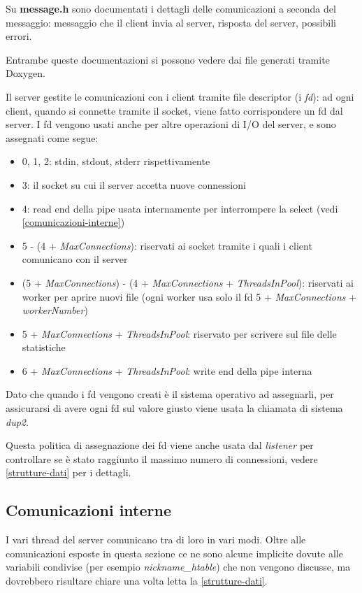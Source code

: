 \documentclass[a4paper]{article}
\theoremstyle{theorem}
\theoremstyle{remark}
\theoremstyle{definition}
\theoremstyle{corollary}
\theoremstyle{lemma}
\newcommand\file[1]{%
	\textbf{#1}}
\newcommand\codeName[1]{%
	\textit{#1}}
\begin{document}
Su \file{message.h} sono documentati i dettagli delle comunicazioni a seconda del messaggio: messaggio che il client invia al server, risposta del server, possibili errori.

Entrambe queste documentazioni si possono vedere dai file generati tramite Doxygen.

Il server gestite le comunicazioni con i client tramite file descriptor (i \textit{fd}): ad ogni client, quando si connette tramite il socket, viene fatto corrispondere un fd dal server. I fd vengono usati anche per altre operazioni di I/O del server, e sono assegnati come segue:
\begin{itemize}
	\item 0, 1, 2: stdin, stdout, stderr rispettivamente
	\item 3: il socket su cui il server accetta nuove connessioni
	\item 4: read end della pipe usata internamente per interrompere la select (vedi \autoref{comunicazioni-interne})
	\item 5 - (4 + \codeName{MaxConnections}): riservati ai socket tramite i quali i client comunicano con il server
	\item (5 + \codeName{MaxConnections}) - (4 + \codeName{MaxConnections} + \codeName{ThreadsInPool}): riservati ai worker per aprire nuovi file (ogni worker usa solo il fd 5 + \codeName{MaxConnections} + \codeName{workerNumber})
	\item 5 + \codeName{MaxConnections} + \codeName{ThreadsInPool}: riservato per scrivere sul file delle statistiche
	\item 6 + \codeName{MaxConnections} + \codeName{ThreadsInPool}: write end della pipe interna
\end{itemize}
Dato che quando i fd vengono creati è il sistema operativo ad assegnarli, per assicurarsi di avere ogni fd sul valore giusto viene usata la chiamata di sistema \codeName{dup2}.

Questa politica di assegnazione dei fd viene anche usata dal \codeName{listener} per controllare se è stato raggiunto il massimo numero di connessioni, vedere \autoref{strutture-dati} per i dettagli.

\subsection{Comunicazioni interne}\label{comunicazioni-interne}
I vari thread del server comunicano tra di loro in vari modi. Oltre alle comunicazioni esposte in questa sezione ce ne sono alcune implicite dovute alle variabili condivise (per esempio \codeName{nickname\_htable}) che non vengono discusse, ma dovrebbero risultare chiare una volta letta la \autoref{strutture-dati}.
\end{document}
